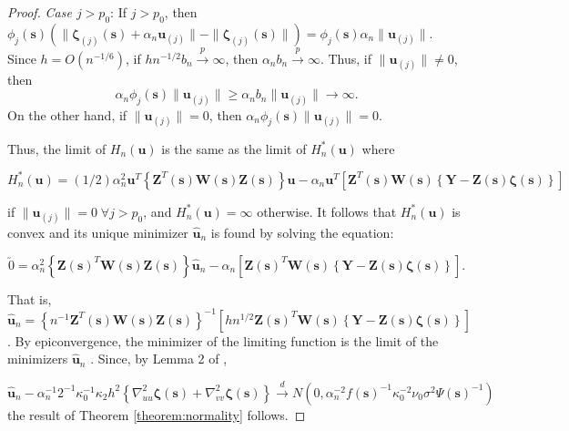 \documentclass[authoryear,review, 12pt]{elsarticle}
\begin{document}
\begin{proof}
\emph{Case $j>p_{0}$}: If $j>p_{0}$, then $\phi_{j}(\bm{s})\left(\|\bm{\zeta}_{\left(j\right)}(\bm{s})+\alpha_{n}\bm{u}_{\left(j\right)}\|-\|\bm{\zeta}_{\left(j\right)}(\bm{s})\|\right)=\phi_{j}(\bm{s})\alpha_{n}\|\bm{u}_{\left(j\right)}\|$.
Since $h=O(n^{-1/6})$, if $hn^{-1/2}b_{n}\xrightarrow{p}\infty$,
then $\alpha_{n}b_{n}\xrightarrow{p}\infty$. Thus, if $\|\bm{u}_{\left(j\right)}\|\ne0$,
then 
\[
\alpha_{n}\phi_{j}(\bm{s})\|\bm{u}_{\left(j\right)}\|\ge\alpha_{n}b_{n}\|\bm{u}_{\left(j\right)}\|\to\infty.
\]
On the other hand, if $\|\bm{u}_{\left(j\right)}\|=0$, then $\alpha_{n}\phi_{j}(\bm{s})\|\bm{u}_{\left(j\right)}\|=0$.

Thus, the limit of $H_{n}\left(\bm{u}\right)$ is the same as the
limit of $H_{n}^{*}\left(\bm{u}\right)$ where

\[
H_{n}^{*}\left(\bm{u}\right)=(1/2)\alpha_{n}^{2}\bm{u}^{T}\left\{ \bm{Z}^{T}(\bm{s})\bm{W}(\bm{s})\bm{Z}(\bm{s})\right\} \bm{u}-\alpha_{n}\bm{u}^{T}\left[\bm{Z}^{T}(\bm{s})\bm{W}(\bm{s})\left\{ \bm{Y}-\bm{Z}(\bm{s})\bm{\zeta}(\bm{s})\right\} \right]
\]


if $\|\bm{u}_{\left(j\right)}\|=0\;\forall j>p_{0}$, and $H_{n}^{*}\left(\bm{u}\right)=\infty$
otherwise. It follows that $H_{n}^{*}\left(\bm{u}\right)$ is convex
and its unique minimizer $\hat{\bm{u}}_{n}$ is found by solving the
equation:

\[
\utilde{0}=\alpha_{n}^{2}\left\{ \bm{Z}\left(\bm{s}\right)^{T}\bm{W}\left(\bm{s}\right)\bm{Z}\left(\bm{s}\right)\right\} \hat{\bm{u}}_{n}-\alpha_{n}\left[\bm{Z}\left(\bm{s}\right)^{T}\bm{W}\left(\bm{s}\right)\left\{ \bm{Y}-\bm{Z}\left(\bm{s}\right)\bm{\zeta}\left(\bm{s}\right)\right\} \right].
\]


That is, $\hat{\bm{u}}_{n}=\left\{ n^{-1}\bm{Z}^{T}\left(\bm{s}\right)\bm{W}\left(\bm{s}\right)\bm{Z}\left(\bm{s}\right)\right\} ^{-1}\left[hn^{1/2}\bm{Z}\left(\bm{s}\right)^{T}\bm{W}\left(\bm{s}\right)\left\{ \bm{Y}-\bm{Z}\left(\bm{s}\right)\bm{\zeta}\left(\bm{s}\right)\right\} \right]$.
By epiconvergence, the minimizer of the limiting function is the limit
of the minimizers $\hat{\bm{u}}_{n}$ \citep{Geyer-1994,Knight-Fu-2000}.
Since, by Lemma 2 of \citet{Sun-Yan-Zhang-Lu-2014},

\[
\hat{\bm{u}}_{n}-\alpha_{n}^{-1}2^{-1}\kappa_{0}^{-1}\kappa_{2}h^{2}\left\{ \nabla_{uu}^{2}\bm{\zeta}(\bm{s})+\nabla_{vv}^{2}\bm{\zeta}(\bm{s})\right\} \xrightarrow{d}N\left(0,\alpha_{n}^{-2}f\left(\bm{s}\right)^{-1}\kappa_{0}^{-2}\nu_{0}\sigma^{2}\Psi\left(\bm{s}\right)^{-1}\right)
\]
the result of Theorem \ref{theorem:normality} follows.
\end{proof}
\end{document}

